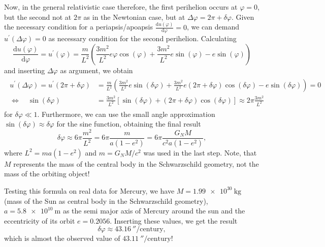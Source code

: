 \documentclass[a4paper,11pt]{article}
\numberwithin{equation}{section}
\begin{document}
{Now, in the general relativistic case therefore, the first perihelion occurs at $\varphi=0$, but the second not at $2\pi$ as in the Newtonian case, but at $\Delta \varphi = 2\pi + \delta \varphi$. Given the necessary condition for a periapsis/apoapsis $\frac{\mathrm{d}u(\varphi)}{\mathrm{d}\varphi} = 0$, we can demand $u^{\prime}(\Delta \varphi) = 0$ as necessary condition for the second perihelion. Calculating \begin{equation}
\frac{\mathrm{d}u(\varphi)}{\mathrm{d}\varphi} = u^\prime(\varphi) = \frac{m}{L^2}\left(\frac{3m^2}{L^2}e\varphi\cos(\varphi) + \frac{3m^2}{L^2}e\sin(\varphi) - e\sin(\varphi)\right)
\end{equation} and inserting $\Delta \varphi$ as argument, we obtain \begin{align}
\begin{aligned}
u^\prime(\Delta \varphi) = u^\prime(2\pi + \delta \varphi) &= \frac{m}{L^2}\left(\frac{3m^2}{L^2}e\sin(\delta \varphi) + \frac{3m^2}{L^2}e(2\pi+ \delta\varphi)\cos(\delta\varphi)-e\sin(\delta\varphi)\right) = 0 \\
\Leftrightarrow \quad \sin(\delta\varphi) &= \frac{3m^2}{L^2}\left[\sin(\delta\varphi)+(2\pi+\delta\varphi)\cos(\delta\varphi)\right] \approx 2\pi\frac{3m^2}{L^2}
\end{aligned}
\end{align} for $\delta \varphi \ll 1$. Furthermore, we can use the small angle approximation $\sin(\delta\varphi) \approx \delta \varphi$ for the sine function, obtaining the final result \begin{equation}
\delta \varphi \approx 6\pi\frac{m^2}{L^2} = 6\pi\frac{m}{a(1-e^2)} = 6\pi\frac{G_N M}{c^2a(1-e^2)},
\end{equation} where $L^2 = ma(1-e^2)$ and $m=G_N M/c^2$ was used in the last step. Note, that $M$ represents the mass of the central body in the Schwarzschild geometry, not the mass of the orbiting object!

Testing this formula on real data for Mercury, we have $M= \SI{1.99e30}{\kilo\gram}$ (mass of the Sun as central body in the Schwarzschild geometry), $a = \SI{5.8e10}{\meter}$ as the semi major axis of Mercury around the sun and the eccentricity of its orbit $e = 0.2056$. Inserting these values, we get the result \begin{equation}
\delta \varphi \approx \SI{43.16}{\arcsecond}/\text{century},
\end{equation} which is almost the observed value of $\SI{43.11}{\arcsecond}/\text{century}$! 
}
\end{document}
